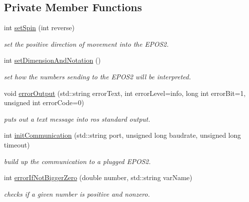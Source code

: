 \subsection*{Private Member Functions}
\begin{DoxyCompactItemize}
\item 
int \hyperlink{classEpos2MotorController_a2ff727bd7ad81302c2feaaf297d888ae}{set\-Spin} (int reverse)
\begin{DoxyCompactList}\small\item\em set the positive direction of movement into the E\-P\-O\-S2. \end{DoxyCompactList}\item 
int \hyperlink{classEpos2MotorController_a8eb9d184e96079a5a995776cf3a453f2}{set\-Dimension\-And\-Notation} ()
\begin{DoxyCompactList}\small\item\em set how the numbers sending to the E\-P\-O\-S2 will be interpreted. \end{DoxyCompactList}\item 
void \hyperlink{classEpos2MotorController_a64d5e3e3858597c111e60ba8b382a63b}{error\-Output} (std\-::string error\-Text, int error\-Level=info, long int error\-Bit=1, unsigned int error\-Code=0)
\begin{DoxyCompactList}\small\item\em puts out a text message into ros standard output. \end{DoxyCompactList}\item 
int \hyperlink{classEpos2MotorController_a6a3f76a6ed867ed6847d9ebac01136ea}{init\-Communication} (std\-::string port, unsigned long baudrate, unsigned long timeout)
\begin{DoxyCompactList}\small\item\em build up the communication to a plugged E\-P\-O\-S2. \end{DoxyCompactList}\item 
int \hyperlink{classEpos2MotorController_a8fc2ecc7f9b6398382a96c760dace71a}{error\-If\-Not\-Bigger\-Zero} (double number, std\-::string var\-Name)
\begin{DoxyCompactList}\small\item\em checks if a given number is positive and nonzero. \end{DoxyCompactList}\end{DoxyCompactItemize}
